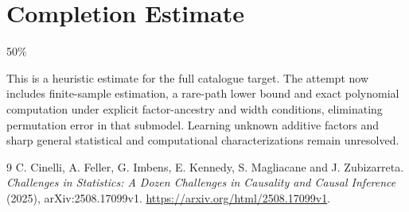 \documentclass[11pt]{article}
\theoremstyle{definition}
\begin{document}
\section{Completion Estimate}
50\%

This is a heuristic estimate for the full catalogue target. The attempt now includes finite-sample estimation, a rare-path lower bound and exact polynomial computation under explicit factor-ancestry and width conditions, eliminating permutation error in that submodel. Learning unknown additive factors and sharp general statistical and computational characterizations remain unresolved.

\begin{thebibliography}{9}
 C. Cinelli, A. Feller, G. Imbens, E. Kennedy, S. Magliacane and J. Zubizarreta.
\emph{Challenges in Statistics: A Dozen Challenges in Causality and Causal Inference} (2025), arXiv:2508.17099v1.
\url{https://arxiv.org/html/2508.17099v1}.
\end{thebibliography}
\end{document}
